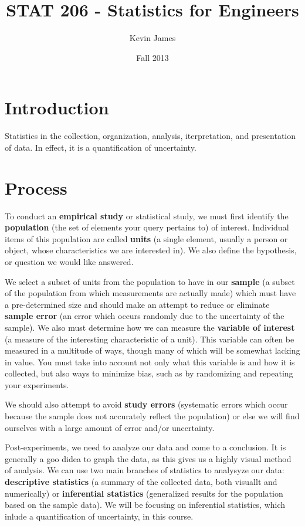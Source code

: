 \documentclass[12pt]{article}
\begin{document}
\title{STAT 206 - Statistics for Engineers}
\author{Kevin James}
\date{\vspace{-2ex}Fall 2013}
\maketitle\HRule

\section*{Introduction}
Statistics in the collection, organization, analysis, iterpretation, and presentation of data. In effect, it is a quantification of uncertainty.

\section*{Process}
To conduct an {\bf empirical study} or statistical study, we must first identify the {\bf population} (the set of elements your query pertains to) of interest. Individual items of this population are called {\bf units} (a single element, usually a person or object, whose characteristics we are interested in). We also define the hypothesis, or question we would like answered.

We select a subset of units from the population to have in our {\bf sample} (a subset of the population from which measurements are actually made) which must have a pre-determined size and should make an attempt to reduce or eliminate {\bf sample error} (an error which occurs randomly due to the uncertainty of the sample). We also must determine how we can measure the {\bf variable of interest} (a measure of the interesting characteristic of a unit). This variable can often be measured in a multitude of ways, though many of which will be somewhat lacking in value. You must take into account not only what this variable is and how it is collected, but also ways to minimize bias, such as by randomizing and repeating your experiments.

We should also attempt to avoid {\bf study errors} (systematic errors which occur because the sample does not accurately reflect the population) or else we will find ourselves with a large amount of error and/or uncertainty.

Post-experiments, we need to analyze our data and come to a conclusion. It is generally a goo didea to graph the data, as this gives us a highly visual method of analysis. We can use two main branches of statistics to analysyze our data: {\bf descriptive statistics} (a summary of the collected data, both visuallt and numerically) or {\bf inferential statistics} (generalized results for the population based on the sample data). We will be focusing on inferential statistics, which inlude a quantification of uncertainty, in this course.
\end{document}
